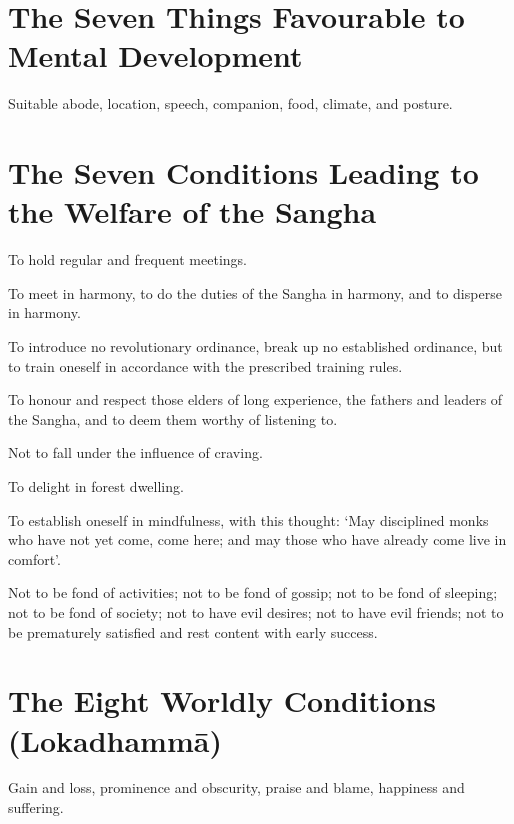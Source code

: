 \section*{The Seven Things Favourable to Mental Development}


Suitable abode, location, speech, companion, food, climate, and posture.\\
\mbox{}

\clearpage

\section*{The Seven Conditions Leading to the Welfare of the Sangha}

To hold regular and frequent meetings.

To meet in harmony, to do the duties of the Sangha in harmony, and to disperse
in harmony.

To introduce no revolutionary ordinance, break up no established ordinance, but
to train oneself in accordance with the prescribed training rules.

To honour and respect those elders of long experience, the fathers and leaders
of the Sangha, and to deem them worthy of listening to.

Not to fall under the influence of craving.

To delight in forest dwelling.

To establish oneself in mindfulness, with this thought: ‘May disciplined monks
who have not yet come, come here; and may those who have already come live in
comfort’.

Not to be fond of activities;
not to be fond of gossip;
not to be fond of sleeping;
not to be fond of society;
not to have evil desires;
not to have evil friends;
not to be prematurely satisfied and rest content with early success.


\section*{The Eight Worldly Conditions (Lokadhammā)}

Gain and loss, prominence and obscurity, praise and blame, happiness and suffering.\\
\mbox{}

\vspace*{-\baselineskip}

